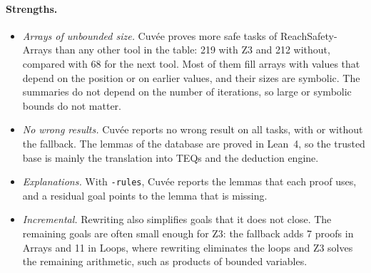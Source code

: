 \documentclass[runningheads]{llncs}
\newcommand{\cuvee}{Cuvée}
\newcommand{\code}[1]{\texttt{#1}}
\begin{document}
\paragraph{Strengths.}
\begin{itemize}
\item \emph{Arrays of unbounded size.} \cuvee{} proves more safe tasks of ReachSafety-Arrays than any other
  tool in the table: 219 with Z3 and 212 without, compared with 68 for the next tool. Most of them fill
  arrays with values that depend on the position or on earlier values, and their sizes are symbolic. The
  summaries do not depend on the number of iterations, so large or symbolic bounds do not matter.
\item \emph{No wrong results.} \cuvee{} reports no wrong result on all tasks, with or without the
  fallback.
  The lemmas of the database are proved in Lean~4, so the trusted base is mainly the translation into
  \acp{TEQ} and the deduction engine.
\item \emph{Explanations.} With \code{-rules}, \cuvee{} reports the lemmas that each proof uses, and
  a residual goal points to the lemma that is missing.
\item \emph{Incremental.} Rewriting also simplifies goals that it does not close. The remaining goals are
  often small enough for Z3: the fallback adds 7 proofs in Arrays and 11 in Loops, where rewriting
  eliminates the loops and Z3 solves the remaining arithmetic, such as products of bounded variables.
\end{itemize}
\end{document}
